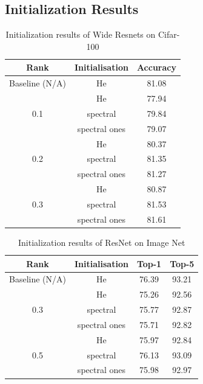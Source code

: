 \documentclass{article}
\begin{document}
\subsection{Initialization Results}
\begin{table}[H]
\centering
\begin{tabular}{|c|c|c|}
\hline
\textbf{Rank} & \textbf{Initialisation} & \textbf{Accuracy} \\
\hline
Baseline (N/A) & He & 81.08 \\
\hline

\multirow{3}{*}{0.1} & He & 77.94 \\ 
                    & spectral   & 79.84 \\
                  & spectral ones & 79.07 \\ 
\hline
\multirow{3}{*}{0.2} & He & 80.37 \\
                    & spectral   & 81.35 \\
                  & spectral ones & 81.27 \\ 
\hline
\multirow{3}{*}{0.3} & He & 80.87 \\  
                    & spectral   & 81.53 \\
                    & spectral ones & 81.61 \\ 
\hline
\end{tabular}
\caption{Initialization results of Wide Resnets on Cifar-100}
\label{wrn_init}
\end{table}

\begin{table}[h]
\centering
\begin{tabular}{|c|c|c|c|}
\hline
\textbf{Rank} & \textbf{Initialisation} & \textbf{Top-1} & \textbf{Top-5} \\
\hline
Baseline (N/A) & He & 76.39 & 93.21 \\
\hline
\multirow{3}{*}{0.3} & He  & 75.26 & 92.56 \\ 
                & spectral   & 75.77 & 92.87 \\
                & spectral ones   & 75.71 & 92.82 \\
\hline
\multirow{3}{*}{0.5} & He  & 75.97 & 92.84 \\
                & spectral   & 76.13 & 93.09 \\
                & spectral ones   & 75.98 & 92.97 \\
\hline
\end{tabular}
\caption{Initialization results of ResNet on Image Net}
\label{imagenet_init}
\end{table}
\end{document}

